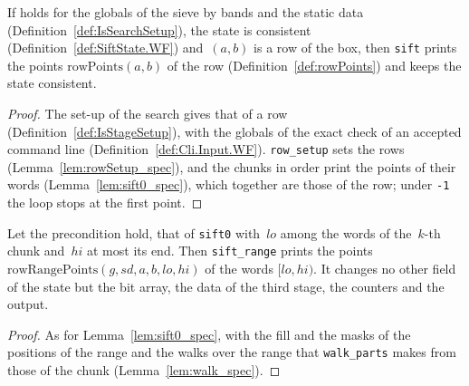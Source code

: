 \begin{lemma}\label{lem:sift_spec}
  \leanok
  If  holds for the globals of the sieve by bands and the static data
  (Definition~\ref{def:IsSearchSetup}), the state is consistent
  (Definition~\ref{def:SiftState.WF}) and~$(a, b)$ is a row of the box, then \texttt{sift} prints
  the points $\mathrm{rowPoints}(a, b)$ of the row (Definition~\ref{def:rowPoints}) and keeps the
  state consistent.
\end{lemma}

\begin{proof}
  \leanok
  The set-up of the search gives that of a row (Definition~\ref{def:IsStageSetup}), with the
  globals of the exact check of an accepted command line (Definition~\ref{def:Cli.Input.WF}).
  \texttt{row\_setup} sets the rows (Lemma~\ref{lem:rowSetup_spec}), and the chunks in order print
  the points of their words (Lemma~\ref{lem:sift0_spec}), which together are those of the row;
  under \texttt{-1} the loop stops at the first point.
\end{proof}

\begin{lemma}\label{lem:siftRange_spec}
  \leanok
  Let the precondition  hold, that of \texttt{sift0} with~$lo$ among
  the words of the~$k$-th chunk and~$hi$ at most its end. Then \texttt{sift\_range} prints the
  points $\mathrm{rowRangePoints}(g, sd, a, b, lo, hi)$ of the words $[lo, hi)$. It changes no
  other field of the state but the bit array, the data of the third stage, the counters and the
  output.
\end{lemma}

\begin{proof}
  \leanok
  As for Lemma~\ref{lem:sift0_spec}, with the fill and the masks of the positions of the range and
  the walks over the range that \texttt{walk\_parts} makes from those of the chunk
  (Lemma~\ref{lem:walk_spec}).
\end{proof}

